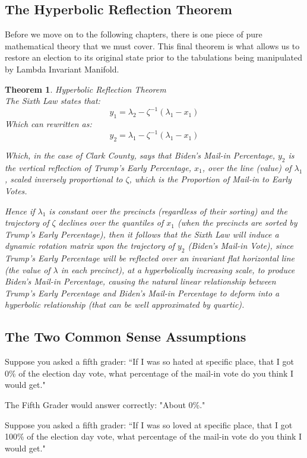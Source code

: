 \documentclass[preprint,13pt]{elsarticle}
\newtheorem{theorem}{Theorem}[section]
\begin{document}
\subsection{The Hyperbolic Reflection Theorem}
Before we move on to the following chapters, there is one piece of pure mathematical theory that we must cover. This final theorem is what allows us to restore an election to its original state prior to the tabulations being manipulated by Lambda Invariant Manifold.
\begin{theorem}{Hyperbolic Reflection Theorem}\\
The Sixth Law states that:
$$y_{1}=\lambda_{2}-\zeta^{-1}(\lambda_{1}-x_{1})$$
Which can rewritten as:
$$y_{2}=\lambda_{1}-\zeta^{-1} (\lambda_{1}-x_{1})$$

Which, in the case of Clark County, says that Biden's Mail-in Percentage, $y_{2}$ is the vertical reflection of Trump's Early Percentage, $x_{1}$, over the line (value) of $\lambda_{1}$, scaled inversely proportional to $\zeta$, which is the Proportion of Mail-in to Early Votes.

Hence if $\lambda_{1}$ is constant over the precincts (regardless of their sorting) and the trajectory of $\zeta$ declines over the quantiles of $x_{1}$ (when the precincts are sorted by Trump's Early Percentage), then it follows that the Sixth Law will induce a dynamic rotation matrix upon the trajectory of $y_{2}$ (Biden's Mail-in Vote), since Trump's Early Percentage will be reflected over an invariant flat horizontal line (the value of $\lambda$ in each precinct), at a hyperbolically increasing scale, to produce Biden's Mail-in Percentage, causing the natural linear relationship between Trump's Early Percentage and Biden's Mail-in Percentage to deform into a hyperbolic relationship (that can be well approximated by quartic).
\end{theorem}
\newpage
\subsection{The Two Common Sense Assumptions}

Suppose you asked a fifth grader: ``If I was so hated at specific place, that I got 0\% of the election day vote, what percentage of the mail-in vote do you think I would get."

The Fifth Grader would answer correctly: "About 0\%."

Suppose you asked a fifth grader: ``If I was so loved at specific place, that I got 100\% of the election day vote, what percentage of the mail-in vote do you think I would get."
\end{document}
